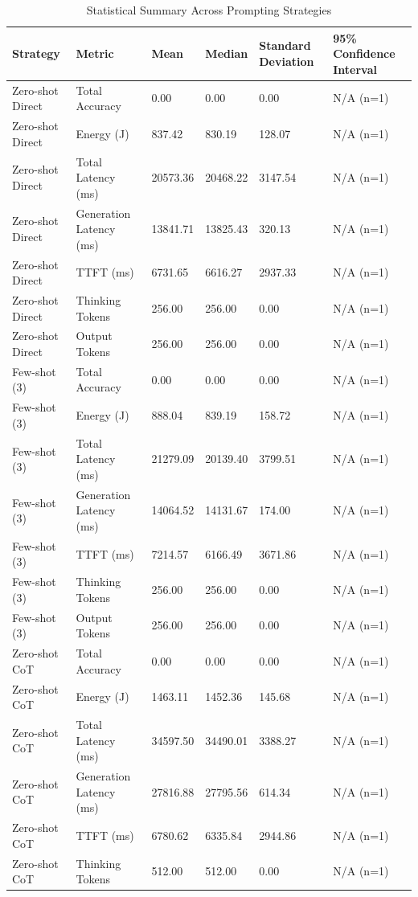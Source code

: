 \begin{table}
\caption{Statistical Summary Across Prompting Strategies}
\label{tab:statistical_summary}
\begin{tabular}{llllll}
\toprule
Strategy & Metric & Mean & Median & Standard Deviation & 95\% Confidence Interval \\
\midrule
Zero-shot Direct & Total Accuracy & 0.00 & 0.00 & 0.00 & N/A (n=1) \\
Zero-shot Direct & Energy (J) & 837.42 & 830.19 & 128.07 & N/A (n=1) \\
Zero-shot Direct & Total Latency (ms) & 20573.36 & 20468.22 & 3147.54 & N/A (n=1) \\
Zero-shot Direct & Generation Latency (ms) & 13841.71 & 13825.43 & 320.13 & N/A (n=1) \\
Zero-shot Direct & TTFT (ms) & 6731.65 & 6616.27 & 2937.33 & N/A (n=1) \\
Zero-shot Direct & Thinking Tokens & 256.00 & 256.00 & 0.00 & N/A (n=1) \\
Zero-shot Direct & Output Tokens & 256.00 & 256.00 & 0.00 & N/A (n=1) \\
Few-shot (3) & Total Accuracy & 0.00 & 0.00 & 0.00 & N/A (n=1) \\
Few-shot (3) & Energy (J) & 888.04 & 839.19 & 158.72 & N/A (n=1) \\
Few-shot (3) & Total Latency (ms) & 21279.09 & 20139.40 & 3799.51 & N/A (n=1) \\
Few-shot (3) & Generation Latency (ms) & 14064.52 & 14131.67 & 174.00 & N/A (n=1) \\
Few-shot (3) & TTFT (ms) & 7214.57 & 6166.49 & 3671.86 & N/A (n=1) \\
Few-shot (3) & Thinking Tokens & 256.00 & 256.00 & 0.00 & N/A (n=1) \\
Few-shot (3) & Output Tokens & 256.00 & 256.00 & 0.00 & N/A (n=1) \\
Zero-shot CoT & Total Accuracy & 0.00 & 0.00 & 0.00 & N/A (n=1) \\
Zero-shot CoT & Energy (J) & 1463.11 & 1452.36 & 145.68 & N/A (n=1) \\
Zero-shot CoT & Total Latency (ms) & 34597.50 & 34490.01 & 3388.27 & N/A (n=1) \\
Zero-shot CoT & Generation Latency (ms) & 27816.88 & 27795.56 & 614.34 & N/A (n=1) \\
Zero-shot CoT & TTFT (ms) & 6780.62 & 6335.84 & 2944.86 & N/A (n=1) \\
Zero-shot CoT & Thinking Tokens & 512.00 & 512.00 & 0.00 & N/A (n=1) \\

\end{tabular}
\end{table}
